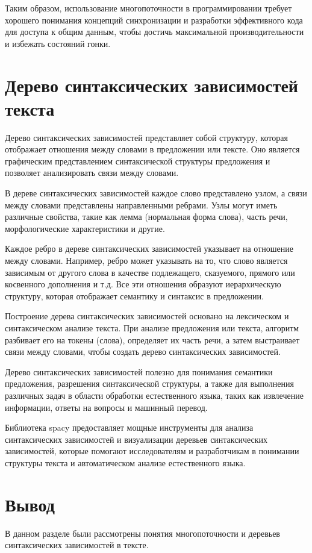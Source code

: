 Таким образом, использование многопоточности в программировании требует хорошего понимания концепций синхронизации и разработки эффективного кода для доступа к общим данным, чтобы достичь максимальной производительности и избежать состояний гонки.

\section{Дерево синтаксических зависимостей \\
	текста}

Дерево синтаксических зависимостей представляет собой структуру, которая отображает отношения между словами в предложении или тексте. Оно является графическим представлением синтаксической структуры предложения и позволяет анализировать связи между словами.

В дереве синтаксических зависимостей каждое слово представлено узлом, а связи между словами представлены направленными ребрами. Узлы могут иметь различные свойства, такие как лемма (нормальная форма слова), часть речи, морфологические характеристики и другие.

Каждое ребро в дереве синтаксических зависимостей указывает на отношение между словами. Например, ребро может указывать на то, что слово является зависимым от другого слова в качестве подлежащего, сказуемого, прямого или косвенного дополнения и т.д. Все эти отношения образуют иерархическую структуру, которая отображает семантику и синтаксис в предложении.

Построение дерева синтаксических зависимостей основано на лексическом и синтаксическом анализе текста. При анализе предложения или текста, алгоритм разбивает его на токены (слова), определяет их часть речи, а затем выстраивает связи между словами, чтобы создать дерево синтаксических зависимостей.

Дерево синтаксических зависимостей полезно для понимания семантики предложения, разрешения синтаксической структуры, а также для выполнения различных задач в области обработки естественного языка, таких как извлечение информации, ответы на вопросы и машинный перевод.

Библиотека spacy предоставляет мощные инструменты для анализа синтаксических зависимостей и визуализации деревьев синтаксических зависимостей, которые помогают исследователям и разработчикам в понимании структуры текста и автоматическом анализе естественного языка.

\section{Вывод}

В данном разделе были рассмотрены понятия многопоточности и деревьев синтаксических зависимостей в тексте.